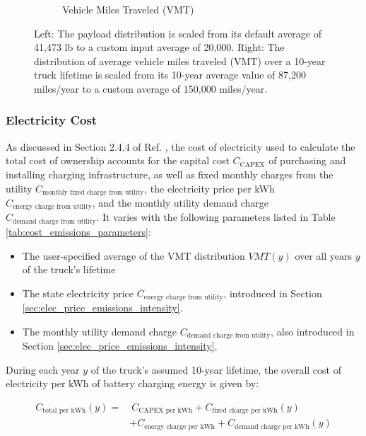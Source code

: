 \begin{figure}[H]
\begin{subfigure}[b]{0.49\textwidth}
        \caption{Vehicle Miles Traveled (VMT)}
        \label{fig:VMT_distribution_average_150000}
    \end{subfigure}
    \caption{Left: The payload distribution is scaled from its default average of 41,473 lb to a custom input average of 20,000. Right: The distribution of average vehicle miles traveled (VMT) over a 10-year truck lifetime is scaled from its 10-year average value of 87,200 miles/year to a custom average of 150,000 miles/year.}
    \label{fig:VMT_payload_scaling}
\end{figure}

\subsubsection{Electricity Cost}

As discussed in Section 2.4.4 of Ref. \cite{Sader_2023}, the cost of electricity used to calculate the total cost of ownership accounts for the capital cost $C_\text{CAPEX}$ of purchasing and installing charging infrastructure, as well as fixed monthly charges from the utility $C_\text{monthly fixed charge from utility}$, the electricity price per kWh $C_\text{energy charge from utility}$, and the monthly utility demand charge $C_\text{demand charge from utility}$. It varies with the following parameters listed in Table \ref{tab:cost_emissions_parameters}:

\begin{itemize}
    \item The user-specified average of the VMT distribution $VMT(y)$ over all years $y$ of the truck's lifetime
    \item The state electricity price $C_\text{energy charge from utility}$, introduced in Section \ref{sec:elec_price_emissions_intensity}.
    \item The monthly utility demand charge $C_\text{demand charge from utility}$, also introduced in Section \ref{sec:elec_price_emissions_intensity}.
\end{itemize}

During each year $y$ of the truck's assumed 10-year lifetime, the overall cost of electricity per kWh of battery charging energy is given by:

\begin{equation}
    \label{eq:total_electricity_cost}
    \begin{aligned}
    C_\text{total per kWh}(y) = & \ C_\text{CAPEX per kWh} + C_\text{fixed charge per kWh}(y) \\
    & + C_\text{energy charge per kWh} + C_\text{demand charge per kWh}(y)
    \end{aligned}
\end{equation}

